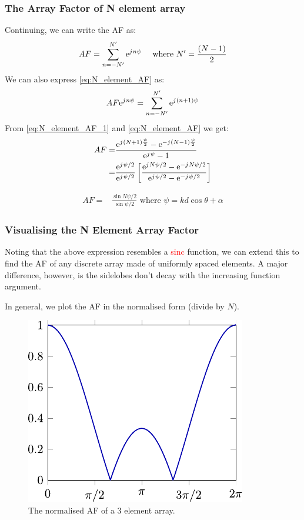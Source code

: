 \documentclass[10pt]{beamer}
\newcommand{\e}{\mathrm{e}} %
\renewcommand{\j}{{j}\mkern1mu} %
\begin{document}
\begin{frame}[fragile]
    \frametitle{The Array Factor of N element array}
Continuing, we can write the AF as:
\small
\begin{equation}
    AF=\sum_{n=-N'}^{N'} \e^{\j n \psi} \quad \text { where } N' =\frac{(N-1)}{2}
    \label{eq:N_element_AF}
\end{equation}
\normalsize
We can also express \eqref{eq:N_element_AF} as:
\small
\begin{equation}
    AF \e^{\j n \psi} =\sum_{n=-N'}^{N'} \e^{\j (n+1) \psi}
    \label{eq:N_element_AF_1}
\end{equation}
\normalsize
From  \eqref{eq:N_element_AF_1} and \eqref{eq:N_element_AF} we get:
\small
\begin{align*}
    AF {}=& \frac{\e^{\j (N+1)\frac{\psi}{2}} - \e^{-\j (N-1)\frac{\psi}{2}}}{\e^{\j \psi} - 1} \\
    {}=& \frac{\e^{\j \psi/2 }}{\e^{\j \psi/2 }} \left[\frac{\e^{\j N\psi/2} - \e^{-\j N\psi/2}}{\e^{\j \psi/2} - \e^{-\j \psi/2}}\right]
\end{align*}
\normalsize
\begin{tcolorbox}[colback=blue!5]
    \begin{align*}
        AF {}=& \frac{\sin N \psi/2 }{\sin \psi/2 } \text { where } \psi =k d \cos \theta + \alpha
    \end{align*}
  \end{tcolorbox}
\end{frame}


\begin{frame}
    \frametitle{Visualising the N Element Array Factor}
Noting that the above expression resembles a \textcolor{red}{sinc} function, we can extend this to find the AF of any discrete array made of uniformly spaced elements. A major difference, however, is the sidelobes don't decay with the increasing function argument.

In general, we plot the AF in the normalised form (divide by $N$).

\begin{figure}[h!]
    \centering
    \includegraphics[width=.4\textwidth]{sinc.pdf}
    \caption{The normalised AF of a 3 element array.}
    \label{fig:3_element}
\end{figure} 
\end{frame}
\end{document}
